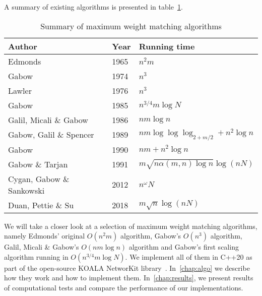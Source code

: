 A summary of existing algorithms is presented in table~\ref{tab:complexity}.

\begin{table}
\centering
\renewcommand{\arraystretch}{1.25}
\setlength{\tabcolsep}{1em}
\begin{tabular}{|l|l|l|}
\hline
Author & Year & Running time \\
\hline
Edmonds & 1965 & $n^2m$ \\
\hline
Gabow & 1974 & $n^3$ \\
\hline
Lawler & 1976 & $n^3$ \\
\hline
Gabow & 1985 & $n^{3/4}m \log N$ \\
\hline
Galil, Micali \& Gabow & 1986 & $nm \log n$ \\
\hline
Gabow, Galil \& Spencer & 1989 & $nm \log \log \log_{2 + m/2} + n^2\log n$ \\
\hline
Gabow & 1990 & $nm + n^2 \log n$ \\
\hline
Gabow \& Tarjan & 1991 & $m \sqrt{n \alpha(m, n) \log n} \log (nN)$ \\
\hline
Cygan, Gabow \& Sankowski & 2012 & $n^\omega N$ \\
\hline
Duan, Pettie \& Su & 2018 & $m \sqrt{n} \log(nN)$ \\
\hline
\end{tabular}
\caption{Summary of maximum weight matching algorithms}\label{tab:complexity}
\end{table}

We will take a closer look at a selection of maximum weight matching algorithms, namely Edmonds' original $O(n^2m)$ algorithm, Gabow's $O(n^3)$ algorithm, Galil, Micali \& Gabow's $O(nm \log n)$ algorithm and Gabow's first scaling algorithm running in $O(n^{3/4}m \log N)$. We implement all of them in C++20 as part of the open-source KOALA NetworKit library~\cite{koala-networkit}. In~\autoref{chap:algo} we describe how they work and how to implement them. In~\autoref{chap:results}, we present results of computational tests and compare the performance of our implementations.
